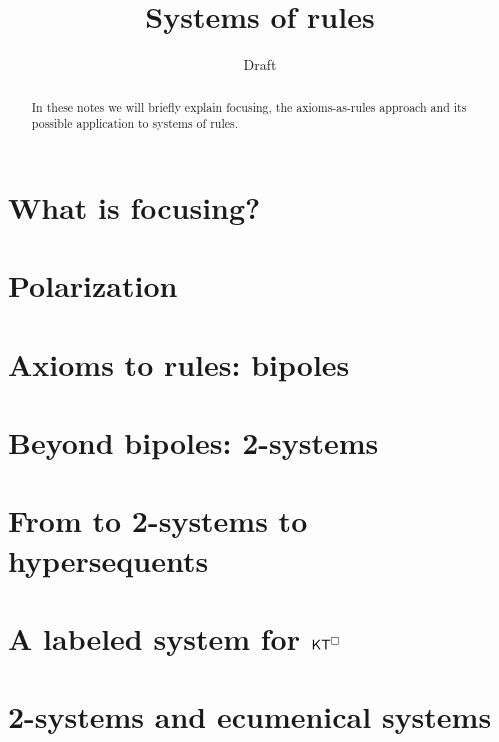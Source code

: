 \documentclass{llncs}
\title{Systems of rules}
\author{Draft}
\institute{\today}
\begin{document}
\maketitle

\begin{abstract}
In these notes we will briefly explain focusing, the axioms-as-rules approach and its possible application to systems of rules.
\end{abstract}

\section{What is focusing?}\label{sec:intro}



\section{Polarization}\label{sec:polarization}


\section{Axioms to rules: bipoles}\label{sec:bipol}


\section{Beyond bipoles: 2-systems}


\section{From to 2-systems to hypersequents}


\section{A labeled system for $\mathsf{K}\mathsf{T}^\Box$}


\section{2-systems and ecumenical systems}\label{sec:ec}



\end{document}
